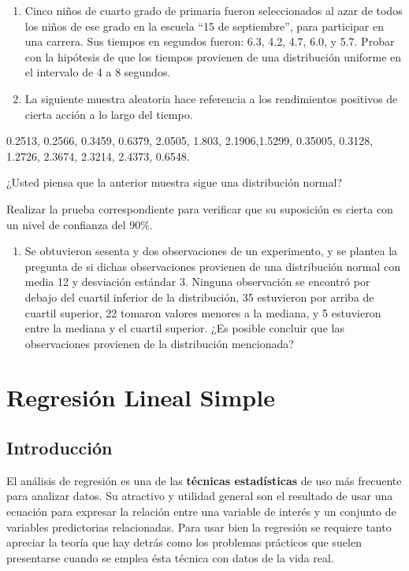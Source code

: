 \documentclass[
  a4paper,
  oneside,
  openany]{book}
\providecommand{\tightlist}{%
  \setlength{\itemsep}{0pt}\setlength{\parskip}{0pt}}
\begin{document}
\begin{enumerate}
\def\labelenumi{\arabic{enumi}.}
\item
  Cinco niños de cuarto grado de primaria fueron seleccionados al azar de todos los niños de ese grado en la escuela ``15 de septiembre'', para participar en una carrera. Sus tiempos en segundos fueron: 6.3, 4.2, 4.7, 6.0, y 5.7. Probar con la hipótesis de que los tiempos provienen de una distribución uniforme en el intervalo de 4 a 8 segundos.
\item
  La siguiente muestra aleatoria hace referencia a los rendimientos positivos de cierta acción a lo largo del tiempo.
\end{enumerate}

0.2513, 0.2566, 0.3459, 0.6379, 2.0505, 1.803, 2.1906,1.5299,
0.35005, 0.3128, 1.2726, 2.3674, 2.3214, 2.4373, 0.6548.

¿Usted piensa que la anterior muestra sigue una distribución normal?

Realizar la prueba correspondiente para verificar que su suposición es cierta con un nivel de confianza del \(90\%\).

\begin{enumerate}
\def\labelenumi{\arabic{enumi}.}
\setcounter{enumi}{2}
\tightlist
\item
  Se obtuvieron sesenta y dos observaciones de un experimento, y se plantea la pregunta de si dichas observaciones provienen de una distribución normal con media 12 y desviación estándar 3. Ninguna observación se encontró por debajo del cuartil inferior de la distribución, 35 estuvieron por arriba de cuartil superior, 22 tomaron valores menores a la mediana, y 5 estuvieron entre la mediana y el cuartil superior. ¿Es posible concluir que las observaciones provienen de la distribución mencionada?
\end{enumerate}

\hypertarget{part-regresiuxf3n-lineal-simple}{%
\part{Regresión Lineal Simple}\label{part-regresiuxf3n-lineal-simple}}

\hypertarget{introducciuxf3n-4}{%
\chapter*{Introducción}\label{introducciuxf3n-4}}


El análisis de regresión es una de las \textbf{técnicas estadísticas} de uso más frecuente para analizar datos. Su atractivo y utilidad general son el resultado de usar una ecuación para expresar la relación entre una variable de interés y un conjunto de variables predictorias relacionadas. Para usar bien la regresión se requiere tanto apreciar la teoría que hay detrás como los problemas prácticos que suelen presentarse cuando se emplea ésta técnica con datos de la vida real.
\end{document}
